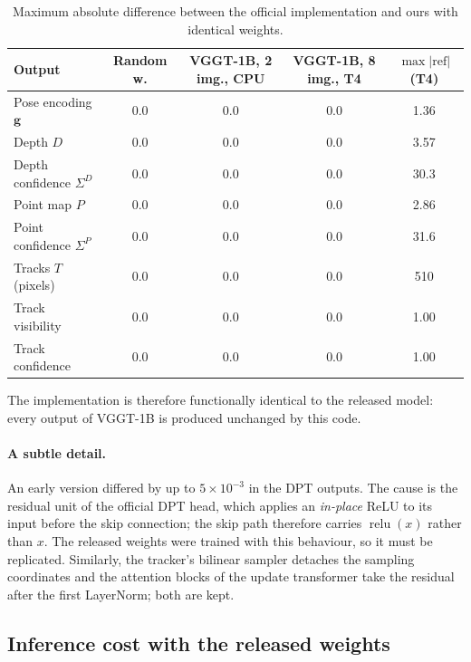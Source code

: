 \documentclass[11pt,a4paper]{article}
\begin{document}
\begin{table}[htbp]
\centering
\caption{Maximum absolute difference between the official implementation and ours with identical weights.}
\label{tab:equiv}
\small
\begin{tabular}{lcccc}
\toprule
Output & Random w. & VGGT-1B, 2 img., CPU & VGGT-1B, 8 img., T4 & $\max|\text{ref}|$ (T4)\\
\midrule
Pose encoding $\mathbf g$          & 0.0 & 0.0 & 0.0 & 1.36 \\
Depth $D$                          & 0.0 & 0.0 & 0.0 & 3.57 \\
Depth confidence $\Sigma^D$        & 0.0 & 0.0 & 0.0 & 30.3 \\
Point map $P$                      & 0.0 & 0.0 & 0.0 & 2.86 \\
Point confidence $\Sigma^P$        & 0.0 & 0.0 & 0.0 & 31.6 \\
Tracks $T$ (pixels)                & 0.0 & 0.0 & 0.0 & 510 \\
Track visibility                   & 0.0 & 0.0 & 0.0 & 1.00 \\
Track confidence                   & 0.0 & 0.0 & 0.0 & 1.00 \\
\bottomrule
\end{tabular}
\end{table}

\noindent The implementation is therefore functionally identical to the released model: every output of VGGT-1B is produced
unchanged by this code.

\paragraph{A subtle detail.} An early version differed by up to $5\times10^{-3}$ in the DPT outputs. The cause is the
residual unit of the official DPT head, which applies an \emph{in-place} ReLU to its input before the skip connection; the
skip path therefore carries $\operatorname{relu}(x)$ rather than $x$. The released weights were trained with this behaviour,
so it must be replicated. Similarly, the tracker's bilinear sampler detaches the sampling coordinates and the attention
blocks of the update transformer take the residual after the first LayerNorm; both are kept.

\subsection{Inference cost with the released weights}
\end{document}
